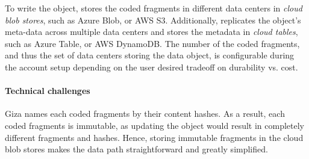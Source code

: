 To write the object,
{\name} stores the coded fragments in different data centers in {\em cloud blob stores},
such as Azure Blob, or AWS S3.
Additionally, \name replicates the object's meta-data across multiple data centers 
and stores the metadata in {\em cloud tables}, such as Azure Table, or AWS DynamoDB. 
The number of the coded fragments, and thus the set of data centers
storing the data object, is configurable during the account setup depending on the user desired tradeoff on
durability vs. cost.

%


\paragraph{Technical challenges}
Giza names each coded fragments by their content hashes.
As a result, each coded fragments is immutable, as updating the object would result in completely different fragments and hashes.
Hence, storing immutable fragments in the cloud blob stores makes the data path straightforward and greatly simplified. 

